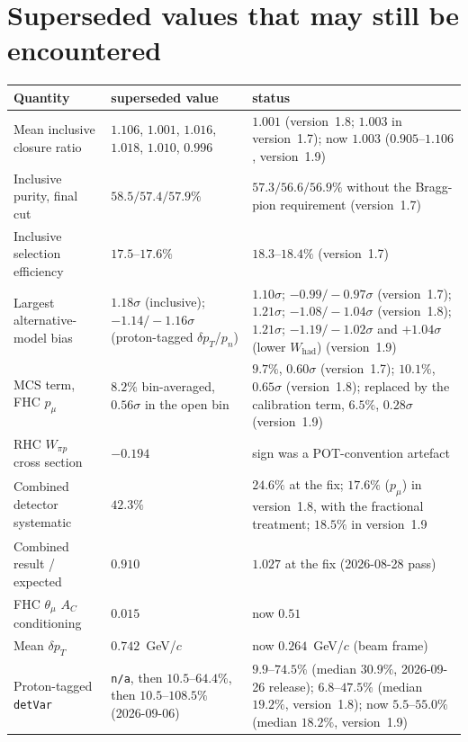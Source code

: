\section{Superseded values that may still be encountered}

\begin{center}\small\setlength{\tabcolsep}{4pt}
\begin{tabular}{p{4.3cm}p{4.2cm}p{6.4cm}}
\toprule
Quantity & superseded value & status \\
\midrule
Mean inclusive closure ratio        & $1.106$, $1.001$, $1.016$, $1.018$, $1.010$, $0.996$ & $1.001$ (version~1.8; $1.003$ in version~1.7); now $1.003$ ($0.905$--$1.106$, version~1.9) \\
Inclusive purity, final cut         & $58.5/57.4/57.9\%$ & $57.3/56.6/56.9\%$ without the Bragg-pion requirement (version~1.7) \\
Inclusive selection efficiency      & $17.5$--$17.6\%$ & $18.3$--$18.4\%$ (version~1.7) \\
Largest alternative-model bias      & $1.18\sigma$ (inclusive); $-1.14/-1.16\sigma$ (proton-tagged $\delta p_T$/$p_n$) & $1.10\sigma$; $-0.99/-0.97\sigma$ (version~1.7); $1.21\sigma$; $-1.08/-1.04\sigma$ (version~1.8); $1.21\sigma$; $-1.19/-1.02\sigma$ and $+1.04\sigma$ (lower $W_\mathrm{had}$) (version~1.9) \\
MCS term, FHC $p_\mu$              & $8.2\%$ bin-averaged, $0.56\sigma$ in the open bin & $9.7\%$, $0.60\sigma$ (version~1.7); $10.1\%$, $0.65\sigma$ (version~1.8); replaced by the calibration term, $6.5\%$, $0.28\sigma$ (version~1.9) \\
RHC $W_{\pi p}$ cross section       & $-0.194$         & sign was a POT-convention artefact \\
Combined detector systematic        & $42.3\%$         & $24.6\%$ at the fix; $17.6\%$ ($p_\mu$) in version~1.8, with the fractional treatment; $18.5\%$ in version~1.9 \\
Combined result / expected          & $0.910$          & $1.027$ at the fix (2026-08-28 pass) \\
FHC $\theta_\mu$ $A_C$ conditioning & $0.015$          & now $0.51$ \\
Mean $\delta p_T$                   & $0.742$~GeV/$c$  & now $0.264$~GeV/$c$ (beam frame) \\
Proton-tagged \texttt{detVar}       & \texttt{n/a}, then $10.5$--$64.4\%$, then $10.5$--$108.5\%$ (2026-09-06) & $9.9$--$74.5\%$ (median $30.9\%$, 2026-09-26 release); $6.8$--$47.5\%$ (median $19.2\%$, version~1.8); now $5.5$--$55.0\%$ (median $18.2\%$, version~1.9) \\

\end{tabular}
\end{center}
